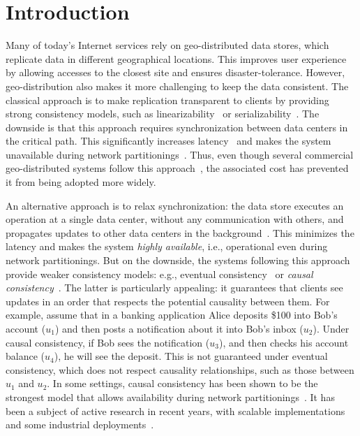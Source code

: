 \section{Introduction}
\label{sec:intro}

Many of today's Internet services rely on geo-distributed data stores, which
replicate data in different geographical locations. This improves user
experience by allowing accesses to the closest site and ensures
disaster-tolerance. However, geo-distribution also makes it more challenging to
keep the data consistent. The classical approach is to make replication
transparent to clients by providing strong consistency models, such as
linearizability~\cite{linearizability} or
serializability~\cite{wv}. The downside is that this approach requires
synchronization between data centers in the critical path. This significantly
increases latency~\cite{pacelc} and makes the system unavailable during network
partitionings~\cite{cap}. Thus, even though several commercial geo-distributed
systems follow this approach~\cite{spanner,cockroachdb,yugabytedb,faunadb,giza},
the associated cost has prevented it from being adopted more widely.

An alternative approach is to relax synchronization: the data store executes an
operation at a single data center, without any communication with others, and
propagates updates to other data centers in the
background~\cite{bayou,dynamo}. This minimizes the latency and makes the system
{\em highly available}, i.e., operational even during network partitionings. But
on the downside, the systems following this approach provide weaker consistency
models: e.g., eventual consistency~\cite{bayou,vogels} or {\em causal
  consistency}~\cite{causal-memory}. The latter is particularly appealing: it
guarantees that clients see updates in an order that respects the potential
causality between them.
For example, assume that in a banking application Alice deposits \$100 into
Bob's account ($u_1$) and then posts a notification about it into Bob's inbox
($u_2$). Under causal consistency, if Bob sees the notification ($u_3$), and
then checks his account balance ($u_4$), he will see the deposit. This is not
guaranteed under eventual consistency, which does not respect causality
relationships, such as those between $u_1$ and $u_2$. In some settings, causal
consistency has been shown to be the strongest model that
allows availability during network partitionings~\cite{hagit-cc,alvisi-cc}. It
has been a subject of active research in recent years, with scalable
implementations~\cite{cure,cops,occult} and some industrial
deployments~\cite{MongoDB,redis}.



